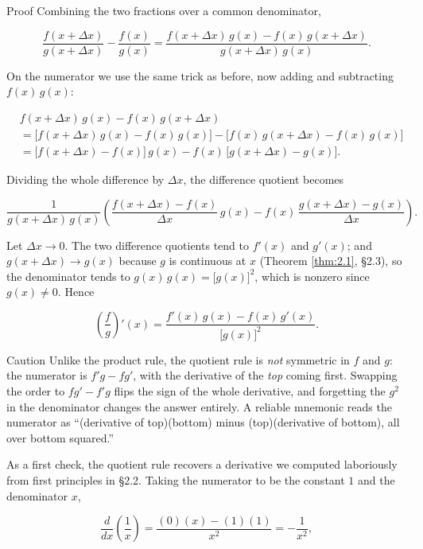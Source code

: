 \documentclass[a4paper,12pt,oneside]{memoir}
\begin{document}
\begin{envproof}{Proof}{}{}
Combining the two fractions over a common denominator,

\[ \frac{f(x+\Delta x)}{g(x+\Delta x)} - \frac{f(x)}{g(x)} = \frac{f(x+\Delta x)\,g(x) - f(x)\,g(x+\Delta x)}{g(x+\Delta x)\,g(x)}. \]

On the numerator we use the same trick as before, now adding and subtracting \(f(x)\,g(x)\):

\[ \begin{aligned}
        &f(x+\Delta x)\,g(x) - f(x)\,g(x+\Delta x) \\[2pt]
        &= \bigl[f(x+\Delta x)\,g(x) - f(x)\,g(x)\bigr] - \bigl[f(x)\,g(x+\Delta x) - f(x)\,g(x)\bigr] \\[2pt]
        &= \bigl[f(x+\Delta x) - f(x)\bigr]\,g(x) - f(x)\,\bigl[g(x+\Delta x) - g(x)\bigr].
      \end{aligned} \]

Dividing the whole difference by \(\Delta x\), the difference quotient becomes

\[ \frac{1}{g(x+\Delta x)\,g(x)}\left( \frac{f(x+\Delta x) - f(x)}{\Delta x}\,g(x) - f(x)\,\frac{g(x+\Delta x) - g(x)}{\Delta x} \right). \]

Let \(\Delta x \to 0\). The two difference quotients tend to \(f'(x)\) and \(g'(x)\); and \(g(x+\Delta x) \to g(x)\) because \(g\) is continuous at \(x\) (Theorem \ref{thm:2.1}, §2.3), so the denominator tends to \(g(x)\,g(x) = \bigl[g(x)\bigr]^{2}\), which is nonzero since \(g(x) \ne 0\). Hence

\[ \left(\frac{f}{g}\right)'(x) = \frac{f'(x)\,g(x) - f(x)\,g'(x)}{\bigl[g(x)\bigr]^{2}}. \]
\end{envproof}
\begin{envcaution}{Caution}{}{}
Unlike the product rule, the quotient rule is \emph{not} symmetric in \(f\) and \(g\): the numerator is \(f'g - f g'\), with the derivative of the \emph{top} coming first. Swapping the order to \(f g' - f' g\) flips the sign of the whole derivative, and forgetting the \(g^{2}\) in the denominator changes the answer entirely. A reliable mnemonic reads the numerator as “(derivative of top)(bottom) minus (top)(derivative of bottom), all over bottom squared.”
\end{envcaution}
As a first check, the quotient rule recovers a derivative we computed laboriously from first principles in §2.2. Taking the numerator to be the constant \(1\) and the denominator \(x\),

\[ \frac{d}{dx}\!\left(\frac{1}{x}\right) = \frac{(0)(x) - (1)(1)}{x^{2}} = -\frac{1}{x^{2}}, \]
\end{document}
